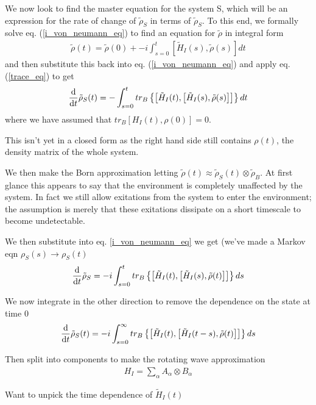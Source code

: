 We now look to find the master equation for the system S, which will be an expression for the rate of change of $\tilde{\rho}_S$ in terms of $\tilde{\rho}_S$. To this end, we formally solve eq. (\ref{i_von_neumann_eq}) to find an equation for $\tilde{\rho}$ in integral form
\begin{align}
  \tilde{\rho}(t) = \tilde{\rho}(0) + -i\int_{s=0}^t \left[ \tilde{H}_I(s), \tilde{\rho}(s) \right] dt
\end{align}
and then substitute this back into eq. (\ref{i_von_neumann_eq}) and apply eq. (\ref{trace_eq}) to get
\begin{align}
  \frac{\mathrm{d}}{\mathrm{d}t} \tilde{\rho}_S(t) = -\int_{s=0}^t tr_B\left\{ \left[ \tilde{H}_I(t), \left[ \tilde{H}_I(s), \tilde{\rho}(s) \right] \right] \right\} dt
\end{align}
where we have assumed that $tr_B [H_I(t), \rho(0)] = 0$.


This isn't yet in a closed form as the right hand side still contains $\rho(t)$, the density matrix of the whole system.

We then make the Born approximation letting $\tilde{\rho}(t) \approx \tilde{\rho}_S(t) \otimes \tilde{\rho}_B$. At first glance this appears to say that the environment is completely unaffected by the system. In fact we still allow exitations from the system to enter the environment; the assumption is merely that these exitations dissipate on a short timescale to become undetectable.

We then substitute into eq. \ref{i_von_neumann_eq} we get (we've made a Markov eqn $\rho_S(s) \rightarrow \rho_S(t)$
\begin{align}
  \frac{\mathrm{d}}{\mathrm{d}t} \tilde{\rho}_S = -i \int_{s=0}^t tr_B\left\{\left[ \tilde{H}_I(t), \left[ \tilde{H}_I(s), \tilde{\rho}(t) \right] \right]\right\} ds
\end{align}

We now integrate in the other direction to remove the dependence on the state at time $0$
\begin{align}
  \frac{\mathrm{d}}{\mathrm{d}t} \tilde{\rho}_S(t) = -i \int_{s=0}^\infty tr_B\left\{\left[ \tilde{H}_I(t), \left[ \tilde{H}_I(t-s), \tilde{\rho}(t) \right] \right]\right\} ds
\end{align}

Then split into components to make the rotating wave approximation
\begin{align}
  H_I = \sum_\alpha A_\alpha \otimes B_\alpha
\end{align}

Want to unpick the time dependence of $\tilde{H}_I(t)$

